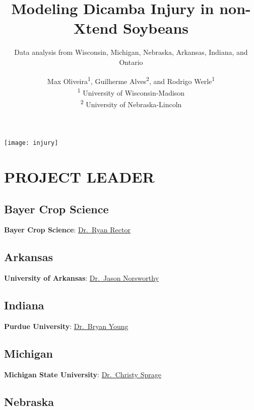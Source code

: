 \documentclass[]{article}
\title{Modeling Dicamba Injury in non-Xtend Soybeans}
\subtitle{Data analysis from Wisconsin, Michigan, Nebraska, Arkansas, Indiana, and
Ontario}
\author{Max Oliveira\textsuperscript{1}, Guilherme Alves\textsuperscript{2}, and
Rodrigo Werle\textsuperscript{1}\\
\textsuperscript{1} University of Wisconsin-Madison\\
\textsuperscript{2} University of Nebraska-Lincoln}
\date{}
\begin{document}
\maketitle

\begin{center}\texttt{[image: injury]} \end{center}

\newpage 

\tableofcontents  \newpage  \listoffigures
\newpage  \listoftables
\newpage

\section{PROJECT LEADER}\label{project-leader}

\subsection{Bayer Crop Science}\label{bayer-crop-science}

\textbf{Bayer Crop Science}:
\href{https://www.cropscience.bayer.com/en}{Dr.~Ryan Rector}

\subsection{Arkansas}\label{arkansas}

\textbf{University of Arkansas}:
\href{https://crop-soil-environmental-sciences.uark.edu/directory/index/uid/jnorswor/name/Jason-Norsworthy/}{Dr.~Jason
Norsworthy}

\subsection{Indiana}\label{indiana}

\textbf{Purdue University}:
\href{https://ag.purdue.edu/btny/Pages/profile.aspx?strAlias=young285}{Dr.~Bryan
Young}

\subsection{Michigan}\label{michigan}

\textbf{Michigan State University}:
\href{https://www.canr.msu.edu/people/christy_sprague}{Dr.~Christy
Sprage}

\subsection{Nebraska}\label{nebraska}
\end{document}
